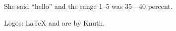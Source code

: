She said ``hello'' and the range 1--5 was 35---40 percent.

Logos: \LaTeX{} and \BibTeX{} are by Knuth.
